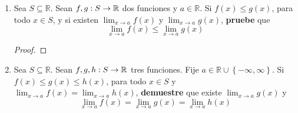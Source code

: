 \documentclass[12pt]{article}
\begin{document}
\begin{enumerate}
    \item Sea $S\subseteq\mathbb{R}$. Sean $f,g:S\rightarrow\mathbb{R}$ dos funciones y $a\in\mathbb{R}$. Si $f(x)\leq g(x)$, para todo $x\in S$, y si existen $\lim_{ x\rightarrow a}f(x)$ y $\lim_{ x\rightarrow a}g(x)$, \textbf{pruebe} que
    \begin{equation*}
        \lim_{ x\rightarrow a}f(x)\leq\lim_{ x\rightarrow a}g(x)
    \end{equation*}

    \begin{proof}
    \end{proof}

    \item Sea $S\subseteq\mathbb{R}$. Sean $f,g,h:S\rightarrow\mathbb{R}$ tres funciones. Fije $a\in\mathbb{R}\cup\left\{-\infty,\infty \right\}$. Si $f(x)\leq g(x)\leq h(x)$, para todo $x\in S$ y $\lim_{ x\rightarrow a}f(x)=\lim_{ x\rightarrow a}h(x)$, \textbf{demuestre} que existe $\lim_{ x\rightarrow a}g(x)$ y
    \begin{equation*}
        \lim_{ x\rightarrow a}f(x)=\lim_{ x\rightarrow a}g(x)=\lim_{ x\rightarrow a}h(x)
    \end{equation*}


\end{enumerate}
\end{document}
